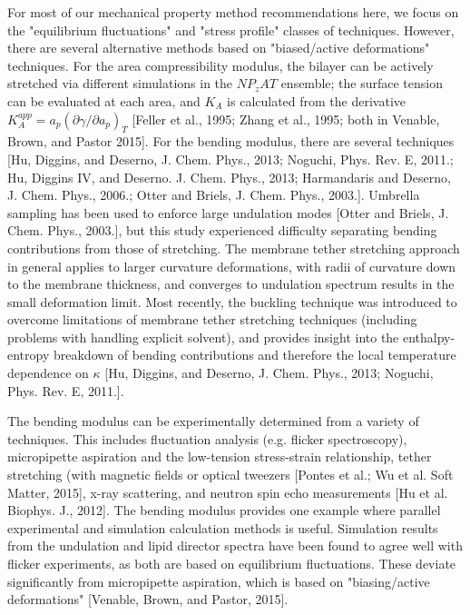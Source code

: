\documentclass[9pt,bestpractices]{livecoms}
\begin{document}
\begin{table}[t]
\begin{tabularx}{\linewidth}{| X | p{3.25in} | p{2.25in} |}
\hline
\end{tabularx}
\end{table}

For most of our mechanical property method recommendations here, we focus on the "equilibrium fluctuations" and "stress profile" classes of techniques.
However, there are several alternative methods based on "biased/active deformations" techniques.
For the area compressibility modulus, the bilayer can be actively stretched via different simulations in the $NP_zAT$ ensemble; the surface tension can be evaluated at each area, and $K_A$ is calculated from the derivative $K_A^{app} = a_p(\partial \gamma / \partial a_p)_T$ [Feller et al., 1995; Zhang et al., 1995; both in Venable, Brown, and Pastor 2015].
For the bending modulus, there are several techniques [Hu, Diggins, and Deserno, J. Chem. Phys., 2013; Noguchi, Phys. Rev. E, 2011.; Hu, Diggins IV, and Deserno. J. Chem. Phys., 2013; Harmandaris and Deserno, J. Chem. Phys., 2006.; Otter and Briels, J. Chem. Phys., 2003.].
Umbrella sampling has been used to enforce large undulation modes [Otter and Briels, J. Chem. Phys., 2003.], but this study experienced difficulty separating bending contributions from those of stretching.
The membrane tether stretching approach in general applies to larger curvature deformations, with radii of curvature down to the membrane thickness, and converges to undulation spectrum results in the small deformation limit.
Most recently, the buckling technique was introduced to overcome limitations of membrane tether stretching techniques (including problems with handling explicit solvent), and provides insight into the enthalpy-entropy breakdown of bending contributions and therefore the local temperature dependence on $\kappa$ [Hu, Diggins, and Deserno, J. Chem. Phys., 2013; Noguchi, Phys. Rev. E, 2011.].

The bending modulus can be experimentally determined from a variety of techniques.
This includes fluctuation analysis (e.g. flicker spectroscopy), micropipette aspiration and the low-tension stress-strain relationship, tether stretching (with magnetic fields or optical tweezers [Pontes et al.; Wu et al. Soft Matter, 2015], x-ray scattering, and neutron spin echo measurements [Hu et al. Biophys. J., 2012].
The bending modulus provides one example where parallel experimental and simulation calculation methods is useful. Simulation results from the undulation and lipid director spectra have been found to agree well with flicker experiments, as both are based on equilibrium fluctuations.
These deviate significantly from micropipette aspiration, which is based on "biasing/active deformations" [Venable, Brown, and Pastor, 2015].
\end{document}
